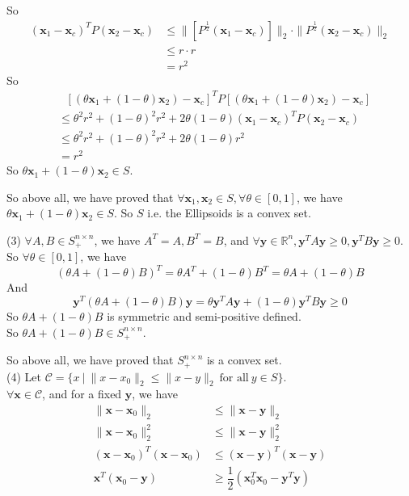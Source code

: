 \documentclass[10pt]{article}
\renewcommand{\mathbf}{\boldsymbol}
\begin{document}
\begin{enumerate}
So
\begin{align*}
    (\mathbf{x}_1-\mathbf{x}_c)^TP(\mathbf{x}_2-\mathbf{x}_c) &\leq \|[P^{\frac{1}{2}}(\mathbf{x}_1-\mathbf{x}_c)]\|_2\cdot\|P^{\frac{1}{2}}(\mathbf{x}_2-\mathbf{x}_c)\|_2\\
    &\leq r\cdot r\\
    &= r^2
\end{align*}
So 
\begin{align*}
    &\ \ \  [(\theta\mathbf{x}_1+(1-\theta)\mathbf{x}_2)-\mathbf{x}_c]^TP[(\theta\mathbf{x}_1+(1-\theta)\mathbf{x}_2)-\mathbf{x}_c] \\
    &\leq \theta^2r^2+(1-\theta)^2r^2+2\theta(1-\theta)(\mathbf{x}_1-\mathbf{x}_c)^TP(\mathbf{x}_2-\mathbf{x}_c)\\
    &\leq \theta^2r^2+(1-\theta)^2r^2+2\theta(1-\theta)r^2\\
    &= r^2
\end{align*}
So $\theta\mathbf{x}_1+(1-\theta)\mathbf{x}_2\in S$.

So above all, we have proved that $\forall\mathbf{x}_1,\mathbf{x}_2\in S, \forall\theta\in [0,1]$, we have $\theta\mathbf{x}_1+(1-\theta)\mathbf{x}_2\in S$. So $S$ i.e. the Ellipsoids is a convex set.


(3) $\forall A,B\in S_+^{n\times n}$, we have $A^T=A,B^T=B$, and $\forall \mathbf{y}\in\mathbb{R}^n, \mathbf{y}^TA\mathbf{y}\geq 0, \mathbf{y}^TB\mathbf{y}\geq 0$.\\
So $\forall\theta\in[0,1]$, we have $$(\theta A+(1-\theta)B)^T=\theta A^T+(1-\theta)B^T=\theta A+(1-\theta)B$$
And $$\mathbf{y}^T(\theta A+(1-\theta)B)\mathbf{y}=\theta\mathbf{y}^TA\mathbf{y}+(1-\theta)\mathbf{y}^TB\mathbf{y}\geq 0$$
So $\theta A+(1-\theta)B$ is symmetric and semi-positive defined.\\
So $\theta A+(1-\theta)B\in S_+^{n\times n}$.

So above all, we have proved that $S_+^{n\times n}$ is a convex set.\\

(4) Let $\mathcal{C}=\Big\{x~\vert~\|x-x_0\|_2\leq\|x-y\|_2~\text{for all}~y\in S\Big\}$.\\
$\forall\mathbf{x}\in\mathcal{C}$, and for a fixed $\mathbf{y}$, we have
\begin{align*}
    \|\mathbf{x}-\mathbf{x}_0\|_2 &\leq \|\mathbf{x}-\mathbf{y}\|_2 \\
    \|\mathbf{x}-\mathbf{x}_0\|_2^2 &\leq \|\mathbf{x}-\mathbf{y}\|_2^2 \\
    (\mathbf{x}-\mathbf{x}_0)^T(\mathbf{x}-\mathbf{x}_0) &\leq (\mathbf{x}-\mathbf{y})^T(\mathbf{x}-\mathbf{y})\\
    \mathbf{x}^T(\mathbf{x}_0-\mathbf{y}) &\geq \dfrac{1}{2}(\mathbf{x}_0^T\mathbf{x}_0-\mathbf{y}^T\mathbf{y})
\end{align*}


\end{enumerate}
\end{document}
